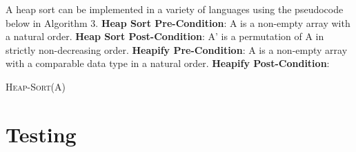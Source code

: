\documentclass[onecolumn, 12pt, article]{IEEEtran}
\numberwithin{case}{problem}
\numberwithin{condition}{problem}
\numberwithin{condition}{subsection}
\numberwithin{definition}{section}
\theoremstyle{remark}
\numberwithin{question}{problem}
\theoremstyle{plain}
\numberwithin{answer}{problem}
\numberwithin{solution}{section}
\numberwithin{equation}{section}%
\begin{document}
A heap sort can be implemented in a variety of languages using the pseudocode below in Algorithm 3.
\newline
\textbf{Heap Sort Pre-Condition}: A is a non-empty array with a natural order.
\newline
\textbf{Heap Sort Post-Condition}: A' is a permutation of A in strictly non-decreasing order.
\newline
\textbf{Heapify Pre-Condition}: A is a non-empty array with a comparable data type in a natural order.
\newline
\textbf{Heapify Post-Condition}: %
\newline
\begin{algorithm}
\caption {\textsc{Heap-Sort}(A)}
\label{algo:heapsort}
\begin{algorithmic}[1]
\EndIf
{}
\EndIf
{}
\EndIf
{}
\EndProcedure
{}
\EndFor
{}
\EndFor
{}
\EndProcedure
\end{algorithmic}
\end{algorithm}

\section{Testing}
\end{document}
